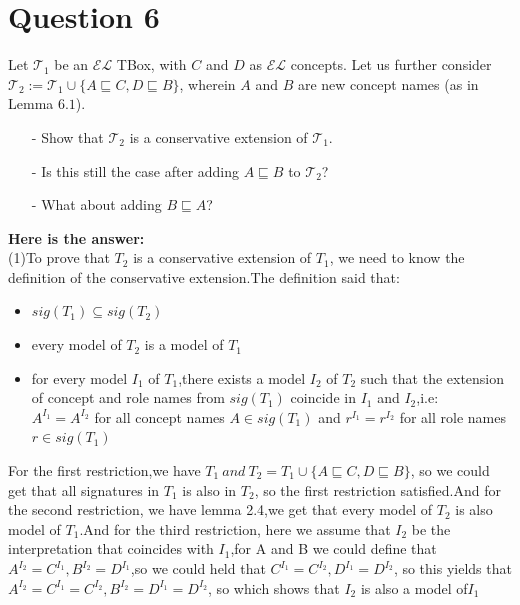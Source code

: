 \documentclass{article}
\begin{document}
    \section{Question 6}
    Let $\mathcal{T}_{1}$ be an $\mathcal{EL}$ TBox, with $C$ and $D$ as $\mathcal{EL}$ concepts. Let us further consider $\mathcal{T}_{2}:=\mathcal{T}_{1}\cup\{A\sqsubseteq C, D\sqsubseteq B\}$, wherein $A$ and $B$ are new concept names (as in Lemma $6.1$). 
    \begin{itemize}
        \item[-] Show that $\mathcal{T}_{2}$ is a conservative extension of $\mathcal{T}_{1}$.
        \item[-] Is this still the case after adding $A\sqsubseteq B$ to $\mathcal{T}_{2}$?
        \item[-] What about adding $B\sqsubseteq A$?
    \end{itemize}
    \textbf{Here is the answer:}\\
    (1)To prove that $T_2$ is a conservative extension of $T_1$, we need to know the definition of the conservative extension.The definition said that:\\
    \begin{itemize}
        \item $sig(T_1) \subseteq sig(T_2)$
        \item every model of $T_2$ is a model of $T_1$ 
        \item for every model $I_1$ of $T_1$,there exists a model $I_2$ of $T_2$ such that the extension of concept and role names from $sig(T_1)$ coincide in $I_1$ and $I_2$,i.e:\\
            $A^{I_1} = A^{I_2}$ for all concept names $A \in sig(T_1)$ and $r^{I_1} = r^{I_2}$ for all role names $r \in sig(T_1)$\\     
    \end{itemize}
    For the first restriction,we have $T_1\ and\ T_2=T_1 \cup \{A\sqsubseteq C, D \sqsubseteq B\}$, so we could get that all signatures in $T_1$ is also in $T_2$, so the first restriction satisfied.And for the second restriction, we have lemma 2.4,we get that every model of $T_2$
    is also model of $T_1$.And for the third restriction, here we assume that $I_2$ be the interpretation that coincides with $I_1$,for A and B we could define that $A^{I_2} = C^{I_1},B^{I_2} = D^{I_1}$,so we could held that $C^{I_1} = C^{I_2},D^{I_1} = D^{I_2}$, so this yields that $A^{I_2} = C^{I_1} = C^{I_2},B^{I_2} = D^{I_1} = D^{I_2}$, so which shows that $I_2$ is also a model of$I_1$\\
    
\end{document}
